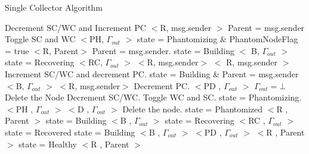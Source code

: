\begin{algorithm}[H]
\scriptsize
\caption{Single Collector Algorithm}
\label{Node Automaton}
\begin{multicols}{2}
\begin{algorithmic}[1]
	\State Decrement SC/WC and Increment PC
		\State $<$R, msg.sender $>$
	\Else
		\State Parent = msg.sender
			\State Toggle SC and WC
			\State $<$PH, $\Gamma_{out}$ $>$ 
			\State state = Phantomizing \& PhantomNodeFlag = true
		\EndIf
				\State $<$R, Parent$>$
		\EndIf
	\EndIf
{}
		\State Parent = msg.sender.
			\State state = Building
			\State $<$ B,  $\Gamma_{out}$ $>$ 
		\Else
			\State state = Recovering
			\State $<$RC, $\Gamma_{out}$ $>$ 
		\EndIf
			\State $<$R,  msg.sender$>$
		\EndIf
	\Else
		\State $<$ R, msg.sender $>$
	\EndIf
{}
	\State Increment SC/WC and decrement PC.
		\State state = Building \& Parent = msg.sender
		\State  $<$B,  $\Gamma_{out}$ $>$ 
	\Else
		\State  $<$R,  msg.sender$>$
	\EndIf
{}
	\State Decrement PC.
	  \State $<$PD , $\Gamma_{out}$ $>$ 
    $\Gamma_{out} = \bot$
  \EndIf
		\State Delete the Node
	\EndIf
{}
	\State Decrement SC/WC.
		\State Toggle WC and SC.
		\State state = Phantomizing.
		\State $<$PH , $\Gamma_{out}$ $>$
		\State $<$D , $\Gamma_{out}$ $>$	
		\State Delete the node.
	\EndIf
{} 
		\State state = Phantomized
			\State $<$R , Parent $>$
		\Else
				\State state = Building
				\State $<$B , $\Gamma_{out}$ $>$
			\Else
				\State state = Recovering
				\State $<$RC , $\Gamma_{out}$ $>$
			\EndIf
		\EndIf
		\State state = Recovered
			\State state = Building
			\State $<$B , $\Gamma_{out}$ $>$
		\Else
				\State $<$PD , $\Gamma_{out}$ $>$
			\Else	
				\State  $<$R , Parent $>$
			\EndIf
		\EndIf
		\State state = Healthy
			\State  $<$R , Parent $>$
		\EndIf
	\EndIf
\EndIf
\EndProcedure
\end{algorithmic}
\end{multicols}
\end{algorithm}	


